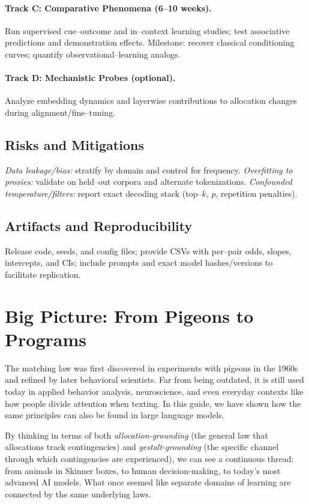 \documentclass[11pt]{article}
\begin{document}
\paragraph{Track C: Comparative Phenomena (6–10 weeks).}
Run supervised cue–outcome and in–context learning studies; test associative predictions and demonstration effects. Milestone: recover classical conditioning curves; quantify observational–learning analogs.

\paragraph{Track D: Mechanistic Probes (optional).}
Analyze embedding dynamics and layerwise contributions to allocation changes during alignment/fine–tuning.

\subsection*{Risks and Mitigations}
\emph{Data leakage/bias:} stratify by domain and control for frequency. \newline
\emph{Overfitting to proxies:} validate on held–out corpora and alternate tokenizations. \newline
\emph{Confounded temperature/filters:} report exact decoding stack (top–$k$, $p$, repetition penalties).

\subsection*{Artifacts and Reproducibility}
Release code, seeds, and config files; provide CSVs with per–pair odds, slopes, intercepts, and CIs; include prompts and exact model hashes/versions to facilitate replication.

\section*{Big Picture: From Pigeons to Programs}

The matching law was first discovered in experiments with pigeons in the 1960s
and refined by later behavioral scientists. Far from being outdated, it is still
used today in applied behavior analysis, neuroscience, and even everyday
contexts like how people divide attention when texting. In this guide, we have
shown how the same principles can also be found in large language models. 

By thinking in terms of both \emph{allocation-grounding} (the general law that
allocations track contingencies) and \emph{gestalt-grounding} (the specific
channel through which contingencies are experienced), we can see a continuous
thread: from animals in Skinner boxes, to human decision-making, to today’s
most advanced AI models. What once seemed like separate domains of learning are
connected by the same underlying laws.
\end{document}
